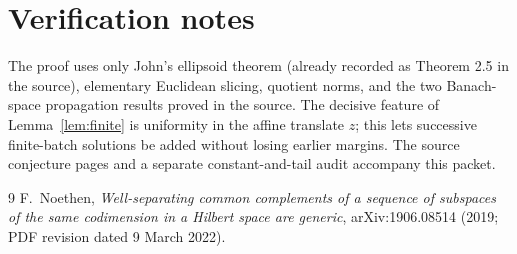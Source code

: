 \documentclass[11pt]{article}
\begin{document}
\section*{Verification notes}

The proof uses only John's ellipsoid theorem (already recorded as Theorem 2.5
in the source), elementary Euclidean slicing, quotient norms, and the two
Banach-space propagation results proved in the source.  The decisive feature
of Lemma~\ref{lem:finite} is uniformity in the affine translate $z$; this lets
successive finite-batch solutions be added without losing earlier margins.
The source conjecture pages and a separate constant-and-tail audit accompany
this packet.

\begin{thebibliography}{9}
F.~Noethen,
\emph{Well-separating common complements of a sequence of subspaces of the
same codimension in a Hilbert space are generic},
arXiv:1906.08514 (2019; PDF revision dated 9 March 2022).
\end{thebibliography}
\end{document}
